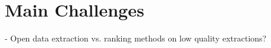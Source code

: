 \section{Main Challenges}\label{sec:challenges}
- Open data extraction vs. ranking methods on low quality extractions?


